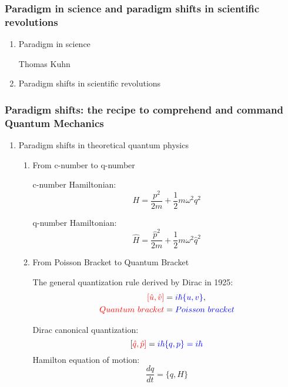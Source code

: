 \documentclass[12pt]{article}
\numberwithin{equation}{section}
\begin{document}
\subsubsection{Paradigm in science and paradigm shifts in scientific revolutions}
\begin{enumerate}
\item Paradigm in science \par
	Thomas Kuhn
\item Paradigm shifts in scientific revolutions
\end{enumerate}
\subsubsection{Paradigm shifts: the recipe to comprehend and command Quantum Mechanics}
\begin{enumerate}
\item Paradigm shifts in theoretical quantum physics \par
	\begin{enumerate}
     	\item From {\color{blue}c-number} to {\color{red}q-number} \par
		{\color{blue} c-number Hamiltonian:
    		\[H=\frac{p^2}{2m}+\frac{1}{2}m\omega^2q^2\]} \par
		{\color{red} q-number Hamiltonian:
		\[\hat{H}=\frac{\hat{p}^2}{2m}+\frac{1}{2}m\omega^2\hat{q}^2\]} \par
	\item From {\color{blue}Poisson Bracket} to {\color{red}Quantum Bracket} \par
		The general quantization rule derived by Dirac in 1925:
		\begin{equation}\begin{split}
			{\color{red}[\hat{u},\hat{v}]}&={\color{blue}i\hbar \{u, v\}}, \\
			{\color{red}Quantum\ bracket} &= {\color{blue}Poisson\ bracket}
		\end{split}\end{equation} \par
		Dirac canonical quantization:
		\begin{equation}
			[{\color{red}\hat{q},\hat{p}]}={\color{blue}i\hbar \{q, p\}=i\hbar}
		\end{equation}
		{\color{blue} Hamilton equation of motion:
		\begin{equation}
			\frac{dq}{dt}=\{q, H\}
		\end{equation}} \par

\end{enumerate}
\end{enumerate}
\end{document}
